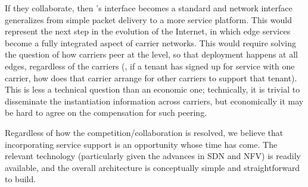 If they collaborate, then \name's interface becomes a standard and network interface generalizes from simple packet delivery to a more service platform.  This would represent the next step in the evolution of the Internet, in which edge services become a fully integrated aspect of carrier networks. This would require solving the question of how carriers peer at the \name level, so that deployment happens at all edges, regardless of the carriers (\ie, if a tenant has signed up for service with one carrier, how does that carrier arrange for other carriers to support that tenant). This is less a technical question than an economic one; technically, it is trivial to disseminate the instantiation information across carriers, but economically it may be hard to agree on the compensation for such peering.

Regardless of how the competition/collaboration is resolved, we believe that incorporating service support is an opportunity whose time has come. The relevant technology (particularly given the advances in SDN and NFV) is readily available, and the overall architecture is conceptually simple and straightforward to build.